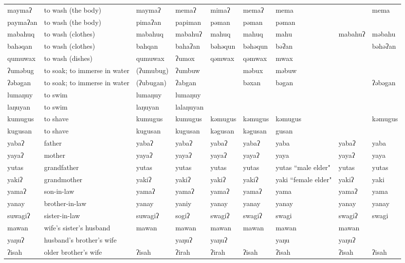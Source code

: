 \begin{landscape}
\begin{longtable}{*{9}{p{}}}
\text{*}maymaʔ & to wash (the body) & maymaʔ & memaʔ & mimaʔ & memaʔ & mema &  & mema\\
\text{*}paymaʔan & to wash (the body) & pimaʔan & papiman & pəman & pəman & pəman &  & \\
\text{*}mabahuq & to wash (clothes) & mabahuq & mabahuʔ & mahuq & mahuq & mahu & mabahuʔ & məbahu\\
\text{*}bahəqan & to wash (clothes) & bahqan & bahaʔan & bəhəqun & bəhəqun & bəʔan &  & bəhəʔan\\
\text{*}qumuwax & to wash (dishes) & qumuwax & ʔumox & qəmwax & qəmwax & mwax &  & \\
\text{*}ʔuməbug & to soak; to immerse in water & (ʔumubug) & ʔumbuw &  & məbux & məbuw &  & \\
\text{*}ʔəbəgan & to soak; to immerse in water & (ʔubugan) & ʔabgan &  & bəxan & bəgan &  & ʔəbəgan\\
\text{*}lumaŋuy & to swim & lumaŋuy & lumaŋuy &  &  &  &  & \\
\text{*}laŋuyan & to swim & laŋuyan & lalaŋuyan &  &  &  &  & \\
\text{*}kumugus & to shave & kumugus & kumugus & kəmugus & kəmugus & kəmugus &  & kəmugus\\
\text{*}kugusan & to shave & kugusan & kugusan & kəgusan & kəgusan & gusan &  & \\
\text{*}yabaʔ & father & yabaʔ & yabaʔ & yabaʔ & yabaʔ & yaba & yabaʔ & yaba\\
\text{*}yayaʔ & mother & yayaʔ & yayaʔ & yayaʔ & yayaʔ & yaya & yayaʔ & yaya\\
\text{*}yutas & grandfather & yutas & yutas & yutas & yutas & yutas ``male elder" & yutas & yutas\\
\text{*}yakiʔ & grandmother & yakiʔ & yakiʔ & yakiʔ & yakiʔ & yaki ``female elder" & yakiʔ & yaki\\
\text{*}yamaʔ & son-in-law & yamaʔ & yamaʔ & yamaʔ & yamaʔ & yama & yamaʔ & yama\\
\text{*}yanay & brother-in-law & yanay & yaniy & yanay & yanay & yanay & yanay & yanay\\
\text{*}suwagiʔ & sister-in-law & suwagiʔ & sogiʔ & swagiʔ & swagiʔ & swagi & swagiʔ & swagi\\
\text{*}mawan & wife's sister's husband & mawan & mawan & mawan & mawan & mawan & mawan & \\
\text{*}yaŋuʔ & husband's brother's wife &  & yaŋuʔ & yaŋuʔ &  & yaŋu & yaŋuʔ & \\
\text{*}ʔisah & older brother's wife & ʔisah & ʔirah & ʔirah & ʔisah & ʔisah & ʔisah & ʔisah\\

\end{longtable}
\end{landscape}
